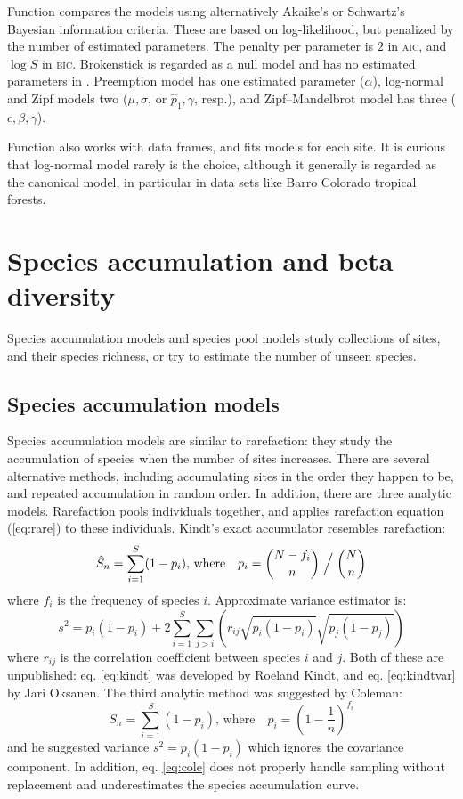 \documentclass[article,nojss]{jss}
\begin{document}
Function  compares the models using alternatively
Akaike's or Schwartz's Bayesian information criteria.  These are based
on log-likelihood, but penalized by the number of estimated
parameters.  The penalty per parameter is $2$ in \textsc{aic}, and
$\log S$ in \textsc{bic}.  Brokenstick is regarded as a null model and
has no estimated parameters in .  Preemption model has
one estimated parameter ($\alpha$), log-normal and Zipf models two
($\mu, \sigma$, or $\hat p_1, \gamma$, resp.), and Zipf--Mandelbrot
model has three ($c, \beta, \gamma$).

Function  also works with data frames, and fits models
for each site. It is curious that log-normal model rarely is the
choice, although it generally is regarded as the canonical model, in
particular in data sets like Barro Colorado tropical forests.

\section{Species accumulation and beta diversity}

Species accumulation models and species pool models study collections
of sites, and their species richness, or try to estimate the number of
unseen species.

\subsection{Species accumulation models}

Species accumulation models are similar to rarefaction: they study the
accumulation of species when the number of sites increases.  There are
several alternative methods, including accumulating sites in the order
they happen to be, and repeated accumulation in random order.  In
addition, there are three analytic models.  Rarefaction pools
individuals together, and applies rarefaction equation (\ref{eq:rare})
to these individuals.  Kindt's exact accumulator resembles rarefaction:
\begin{equation}
\label{eq:kindt}
\hat S_n = \sum_{i=1}^S (1 - p_i), \, \text{where} \quad p_i = {N- f_i
\choose n} \Bigm / {N \choose n}
\end{equation}
where $f_i$ is the frequency of species $i$.  Approximate variance
estimator is:
\begin{equation}
\label{eq:kindtvar}
s^2 = p_i (1 - p_i) + 2 \sum_{i=1}^S \sum_{j>i} \left( r_{ij}
  \sqrt{p_i(1-p_i)} \sqrt{p_j (1-p_j)}\right)
\end{equation}
where $r_{ij}$ is the correlation coefficient between species $i$ and
$j$.  Both of these are unpublished: eq. \ref{eq:kindt} was developed
by Roeland Kindt, and eq. \ref{eq:kindtvar} by Jari Oksanen. The third
analytic method was suggested by Coleman:
\begin{equation}
\label{eq:cole}
S_n = \sum_{i=1}^S (1 - p_i), \, \text{where} \quad p_i = \left(1 - \frac{1}{n}\right)^{f_i}
\end{equation}
and he suggested variance $s^2 = p_i (1-p_i)$ which ignores the
covariance component.  In addition, eq. \ref{eq:cole} does not
properly handle sampling without replacement and underestimates the
species accumulation curve.
\end{document}
